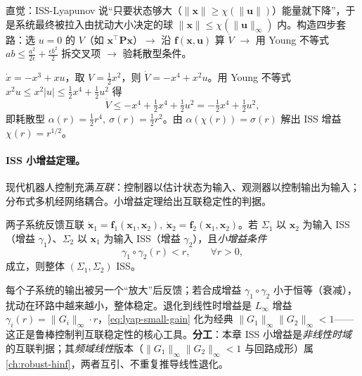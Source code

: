 \noindent 直觉：ISS-Lyapunov 说“只要状态够大（$\|\mathbf{x}\|\ge\chi(\|\mathbf{u}\|)$）能量就下降”，于是系统最终被拉入由扰动大小决定的球 $\|\mathbf{x}\|\le\chi(\|\mathbf{u}\|_\infty)$ 内。构造四步套路：选 $u=0$ 的 $V$（如 $\mathbf{x}^\top\mathbf{P}\mathbf{x}$）$\to$ 沿 $\mathbf{f}(\mathbf{x},\mathbf{u})$ 算 $\dot V$ $\to$ 用 Young 不等式 $ab\le\tfrac{a^2}{2\epsilon}+\tfrac{\epsilon b^2}{2}$ 拆交叉项 $\to$ 验耗散型条件。

\begin{example}[标量 ISS 范例]
\label{ex:lyap-iss}
$\dot x=-x^3+xu$，取 $V=\tfrac12 x^2$，则 $\dot V=-x^4+x^2u$。用 Young 不等式 $x^2u\le x^2|u|\le\tfrac12 x^4+\tfrac12 u^2$ 得
\begin{equation}
  \dot V\le-x^4+\tfrac12 x^4+\tfrac12 u^2=-\tfrac12 x^4+\tfrac12 u^2,
  \label{eq:lyap-iss-example}
\end{equation}
即耗散型 $\alpha(r)=\tfrac12 r^4,\ \sigma(r)=\tfrac12 r^2$。由 $\alpha(\chi(r))=\sigma(r)$ 解出 ISS 增益 $\chi(r)=r^{1/2}$。
\end{example}

\paragraph{ISS 小增益定理。}
现代机器人控制充满\emph{互联}：控制器以估计状态为输入、观测器以控制输出为输入；分布式多机经网络耦合。小增益定理给出互联稳定性的判据。

\begin{theorem}
\label{thm:lyap-small-gain}
两子系统反馈互联 $\dot{\mathbf{x}}_1=\mathbf{f}_1(\mathbf{x}_1,\mathbf{x}_2),\ \dot{\mathbf{x}}_2=\mathbf{f}_2(\mathbf{x}_1,\mathbf{x}_2)$。若 $\Sigma_1$ 以 $\mathbf{x}_2$ 为输入 ISS（增益 $\gamma_1$）、$\Sigma_2$ 以 $\mathbf{x}_1$ 为输入 ISS（增益 $\gamma_2$），且\emph{小增益条件}
\begin{equation}
  \gamma_1\circ\gamma_2(r)<r,\qquad\forall r>0,
  \label{eq:lyap-small-gain}
\end{equation}
成立，则整体 $(\Sigma_1,\Sigma_2)$ ISS\cite{jiang1994smallgain}。
\end{theorem}

\begin{insight}
每个子系统的输出被另一个“放大”后反馈；若合成增益 $\gamma_1\circ\gamma_2$ 小于恒等（衰减），扰动在环路中越来越小，整体稳定。退化到线性时增益是 $L_\infty$ 增益 $\gamma_i(r)=\|G_i\|_\infty\cdot r$，\cref{eq:lyap-small-gain} 化为经典 $\|G_1\|_\infty\|G_2\|_\infty<1$——这正是鲁棒控制判互联稳定性的核心工具。\textbf{分工}：本章 ISS 小增益是\emph{非线性时域}的互联判据；其\emph{频域线性}版本（$\|G_1\|_\infty\|G_2\|_\infty<1$ 与回路成形）属 \cref{ch:robust-hinf}，两者互引、不重复推导线性退化。
\end{insight}

